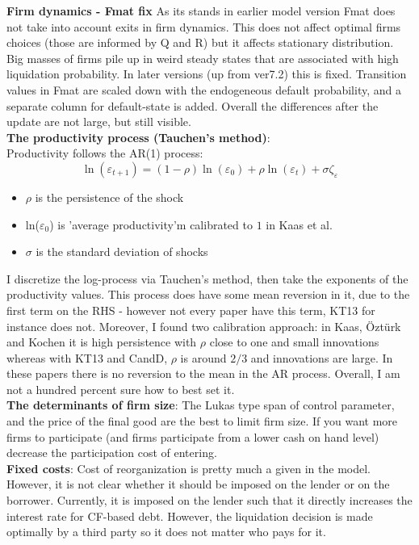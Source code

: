 \documentclass[12pt]{article}
\begin{document}
\textbf{Firm dynamics - Fmat fix} As its stands in earlier model version Fmat does not take into account exits in firm dynamics. This does not affect optimal firms choices (those are informed by Q and R) but it affects stationary distribution. Big masses of firms pile up in weird steady states that are associated with high liquidation probability. In later versions (up from ver7.2) this is fixed. Transition values in Fmat are scaled down with the endogeneous default probability, and a separate column for default-state is added. Overall the differences after the update are not large, but still visible. \vspace{3mm} \\
\textbf{The productivity process (Tauchen's method)}: \\
Productivity follows the AR(1) process:
$$ \ln(\varepsilon_{t+1}) = (1-\rho) \ln(\varepsilon_0) + \rho \ln(\varepsilon_t) + \sigma \zeta_\varepsilon $$
\begin{itemize}\setlength\itemsep{0em} \small
    \item $\rho$ is the persistence of the shock
    \item ln($\varepsilon_0$) is 'average productivity'm calibrated to $1$ in Kaas et al.
    \item $\sigma$ is the standard deviation of shocks
\end{itemize} \normalsize
I discretize the log-process via Tauchen's method, then take the exponents of the productivity values. This process does have some mean reversion in it, due to the first term on the RHS - however not every paper have this term, KT13 for instance does not. Moreover, I found two calibration approach: in Kaas, Öztürk and Kochen it is high persistence with $\rho$ close to one and small innovations whereas with KT13 and CandD, $\rho$ is around $2/3$ and innovations are large. In these papers there is no reversion to the mean in the AR process. Overall, I am not a hundred percent sure how to best set it.  \vspace{3mm} \\
\textbf{The determinants of firm size}:
 The Lukas type span of control parameter, and the price of the final good are the best to limit firm size. If you want more firms to participate (and firms participate from a lower cash on hand level) decrease the participation cost of entering. \vspace{3mm} \\
\textbf{Fixed costs}:
Cost of reorganization is pretty much a given in the model. However, it is not clear whether it should be imposed on the lender or on the borrower. Currently, it is imposed on the lender such that it directly increases the interest rate for CF-based debt. However, the liquidation decision is made optimally by a third party so it does not matter who pays for it.  \vspace{3mm} \\
\end{document}

